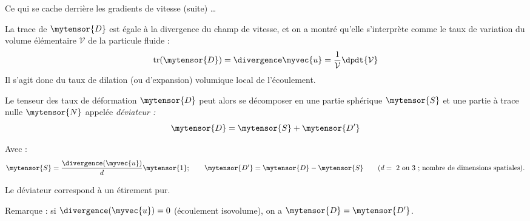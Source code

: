 \begin{frame}{Ce qui se cache derrière les gradients de vitesse (suite) \ldots}


\small

La trace de $\mytensor{D}$  est égale à la divergence du champ de vitesse,  et on a montré qu'elle s'interprète comme le taux de variation du volume élémentaire $\mathcal{V}$ de la particule fluide :
\[
	\mbox{tr}(\mytensor{D}) = \divergence \myvec{u} = \frac{1}{\mathcal{V}} \dpdt{\mathcal{V}}
\]
Il s'agit donc du \textcolor{vert}{taux de dilation} (ou d'expansion) volumique local de l'écoulement.






\pause


Le \textcolor{rouge}{tenseur des taux de déformation $\mytensor{D}$} 
 peut alors se décomposer
en une partie sphérique $\mytensor{S}$ et une partie à trace nulle $\mytensor{N}$ appelée {\em déviateur :} 
\[
	\mytensor{D} = 
	\mytensor{S} + \mytensor{D'} 
\]

Avec : 
\[
\mytensor{S} = 
	\frac{\divergence (\myvec{u})}{d} \mytensor{1} ; \qquad \mytensor{D'} = \mytensor{D}-\mytensor{S}  \qquad ( d  = \mbox{   2 ou 3 ; nombre de dimensions spatiales}).
\]	

%
%
%		




\pause
\bigskip
Le déviateur correspond à un \textcolor{rouge}{étirement pur}. 
 


\pause 
\smallskip
Remarque : si $\divergence (\myvec{u}) = 0$ (écoulement isovolume), on a
$\mytensor{D} = \mytensor{D'}$.


\vspace{10mm}

\end{frame}


